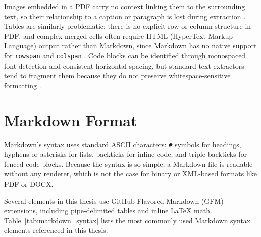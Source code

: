 Images embedded in a PDF carry no context linking them to the surrounding text,
so their relationship to a caption or paragraph is lost during extraction
\autocite{gao2011}. Tables are similarly problematic: there is no explicit row
or column structure in PDF, and complex merged cells often require
HTML (HyperText Markup Language) output rather than Markdown, since Markdown has no native support for \texttt{rowspan}
and \texttt{colspan} \autocite{zhu2022}. Code blocks can be identified through
monospaced font detection and consistent horizontal spacing, but standard text
extractors tend to fragment them because they do not preserve
whitespace-sensitive formatting \autocite{meuschke2023}.

\section{Markdown Format}

Markdown's syntax uses standard ASCII characters:
\texttt{\#} symbols for headings, hyphens or asterisks for lists, backticks for
inline code, and triple backticks for fenced code blocks. Because the syntax is
so simple, a Markdown file is readable without any renderer, which is not the
case for binary or XML-based formats like PDF or DOCX.

Several elements in this thesis use GitHub Flavored Markdown (GFM) extensions,
including pipe-delimited tables and inline \LaTeX{} math.
Table~\ref{tab:markdown_syntax} lists the most commonly used Markdown syntax
elements referenced in this thesis.

